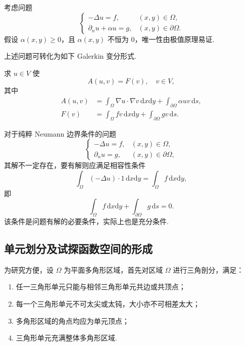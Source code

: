 考虑问题
\begin{equation*}
\begin{cases}
-\Delta u = f, & (x,y) \in \Omega, \\
\partial_n u + \alpha u = g, & (x,y) \in \partial\Omega.
\end{cases}
\end{equation*}
假设 $\alpha(x,y) \ge 0$，且 $\alpha(x,y)$ 不恒为 $0$，唯一性由极值原理易证.\par

上述问题可转化为如下 Galerkin 变分形式.

求 $u \in V$ 使
\begin{equation*}
A(u,v) = F(v), \quad v \in V,
\end{equation*}
其中
\begin{align*}
A(u,v) &= \int_\Omega \nabla u \cdot \nabla v \, \mathrm{d}x\mathrm{d}y + \int_{\partial\Omega} \alpha u v \, \mathrm{d}s, \\
F(v) &= \int_\Omega f v \, \mathrm{d}x\mathrm{d}y + \int_{\partial\Omega} g v \, \mathrm{d}s.
\end{align*}

对于纯粹 Neumann 边界条件的问题
\begin{equation*}
\begin{cases}
-\Delta u = f, & (x,y) \in \Omega, \\
\partial_n u = g, & (x,y) \in \partial\Omega,
\end{cases}
\end{equation*}
其解不一定存在，要有解则应满足相容性条件
\begin{equation*}
\int_\Omega (-\Delta u) \cdot 1 \, \mathrm{d}x\mathrm{d}y = \int_\Omega f \, \mathrm{d}x\mathrm{d}y,
\end{equation*}
即
\begin{equation*}
\int_\Omega f \, \mathrm{d}x\mathrm{d}y + \int_{\partial\Omega} g \, \mathrm{d}s = 0.
\end{equation*}
该条件是问题有解的必要条件，实际上也是充分条件.\par

\subsection{单元划分及试探函数空间的形成}

为研究方便，设 $\Omega$ 为平面多角形区域，首先对区域 $\Omega$ 进行三角剖分，满足：
\begin{enumerate}
\item 任一三角形单元只能与相邻三角形单元共边或共顶点；
\item 每一个三角形单元不可太尖或太钝，大小亦不可相差太大；
\item 多角形区域的角点均应为单元顶点；
\item 三角形单元充满整体多角形区域.
\end{enumerate}

